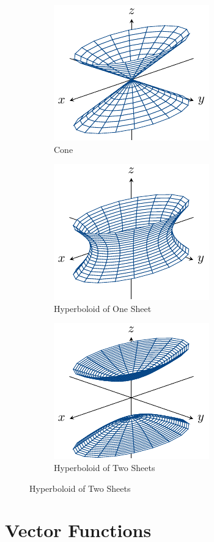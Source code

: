 \documentclass{book}
\theoremstyle{remark}
\begin{document}
\begin{figure}[ht]
\begin{subfigure}{0.3\textwidth}
    \centering
    \includegraphics{figures/cone.pdf}
    \caption{Cone}
\end{subfigure}
\begin{subfigure}{0.3\textwidth}
    \centering
    \includegraphics{figures/hyperboloid_of_one_sheet.pdf}
    \caption{Hyperboloid of One Sheet}
\end{subfigure}
\begin{subfigure}{0.3\textwidth}
    \centering
    \includegraphics{figures/hyperboloid_of_two_sheets.pdf}
    \caption{Hyperboloid of Two Sheets}
\end{subfigure}

\end{figure}

\section{Vector Functions}
\end{document}

